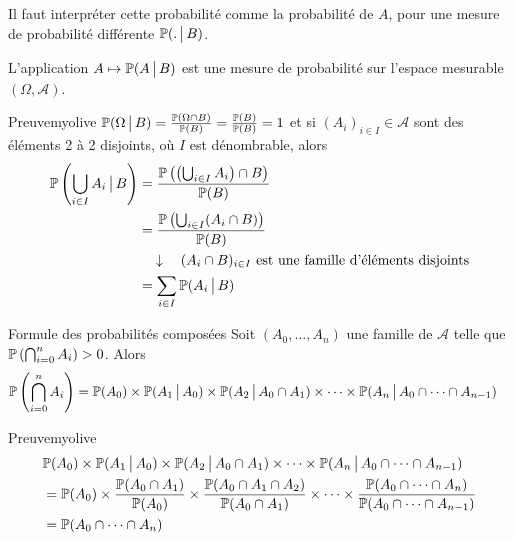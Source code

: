     Il faut interpréter cette probabilité comme la probabilité de $A$, pour une mesure de probabilité différente $\P(. \vbar B)$. 

    \begin{prop}{}{}
        L’application $A \mapsto \P(A \vbar B)$ est une mesure de probabilité sur l’espace mesurable $(\Omega, \mathcal{A})$. 
    \end{prop}

    \begin{demo}{Preuve}{myolive}
        $\P(\Omega \vbar B) = \frac{\P(\Omega \cap B)}{\P(B)} = \frac{\P(B)}{\P(B)} = 1$ et si $(A_i)_{i \in I} \in \mathcal{A}$ sont des éléments 2 à 2 disjoints, où $I$ est dénombrable, alors 
        \begin{align*}
            \P\left(\bigcup_{i \in I} A_i \vbar B\right) 
            &= \frac{\P\left(\left(\bigcup_{i \in I} A_i\right) \cap B\right)}{\P(B)} \\
            &= \frac{\P\left(\bigcup_{i \in I} (A_i \cap B)\right)}{\P(B)} \\
            &\argu (A_i \cap B)_{i \in I} \text{ est une famille d’éléments disjoints} \\
            &= \sum_{i \in I} \P(A_i \vbar B) \\
        \end{align*}
    \end{demo}

    \begin{prop}{Formule des probabilités composées}{}
        Soit $(A_0, \ldots, A_n)$ une famille de $\mathcal{A}$ telle que $\P\left(\bigcap_{i =0}^n A_i\right) > 0$. Alors 
        \begin{align*}
            \P\left(\bigcap_{i =0}^n A_i\right)
            &= \P(A_0) \times \P(A_1 \vbar A_0) \times \P(A_2 \vbar A_0 \cap A_1) \times \cdots \times \P(A_n \vbar A_0 \cap \cdots \cap A_{n - 1})
        \end{align*}
    \end{prop}

    \begin{demo}{Preuve}{myolive}
        \begin{align*}
            &\P(A_0) \times \P(A_1 \vbar A_0) \times \P(A_2 \vbar A_0 \cap A_1) \times \cdots \times \P(A_n \vbar A_0 \cap \cdots \cap A_{n - 1}) \\
            &= \P(A_0) \times \frac{\P(A_0 \cap A_1)}{\P(A_0)} \times \frac{\P(A_0 \cap A_1 \cap A_2)}{\P(A_0 \cap A_1)} \times \cdots \times \frac{\P(A_0 \cap \cdots \cap A_n)}{\P(A_0 \cap \cdots \cap A_{n-1})} \\
            &= \P(A_0 \cap \cdots \cap A_n)
        \end{align*}
    \end{demo}

